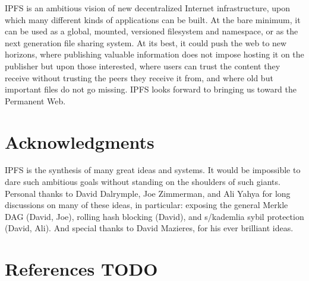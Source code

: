 \documentclass{sig-alternate}
\begin{document}
IPFS is an ambitious vision of new decentralized Internet infrastructure, upon which many different kinds of applications can be built. At the bare minimum, it can be used as a global, mounted, versioned filesystem and namespace, or as the next generation file sharing system. At its best, it could push the web to new horizons, where publishing valuable information does not impose hosting it on the publisher but upon those interested, where users can trust the content they receive without trusting the peers they receive it from, and where old but important files do not go missing. IPFS looks forward to bringing us toward the Permanent Web.


\section{Acknowledgments}

IPFS is the synthesis of many great ideas and systems. It would be impossible to dare such ambitious goals without standing on the shoulders of such giants. Personal thanks to David Dalrymple, Joe Zimmerman, and Ali Yahya for long discussions on many of these ideas, in particular: exposing the general Merkle DAG (David, Joe), rolling hash blocking (David), and s/kademlia sybil protection (David, Ali). And special thanks to David Mazieres, for his ever brilliant ideas.

\section{References TODO}



\end{document}
